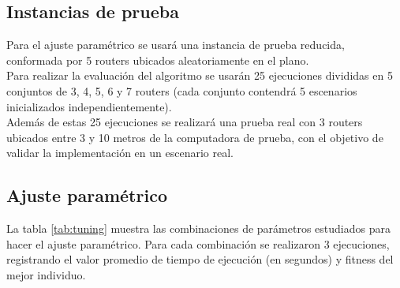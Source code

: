 \documentclass[journal]{IEEEtran}
\begin{document}
\subsection{Instancias de prueba}

Para el ajuste paramétrico se usará una instancia de prueba reducida, conformada por 5 routers ubicados aleatoriamente en el plano.\\

Para realizar la evaluación del algoritmo se usarán 25 ejecuciones divididas en 5 conjuntos de 3, 4, 5, 6 y 7 routers (cada conjunto contendrá 5 escenarios inicializados independientemente).\\

Además de estas 25 ejecuciones se realizará una prueba real con 3 routers ubicados entre 3 y 10 metros de la computadora de prueba, con el objetivo de validar la implementación en un escenario real.\\

\subsection{Ajuste paramétrico}

La tabla \ref{tab:tuning} muestra las combinaciones de parámetros estudiados para hacer el ajuste paramétrico. Para cada combinación se realizaron 3 ejecuciones, registrando el valor promedio de tiempo de ejecución (en segundos) y fitness del mejor individuo.
\end{document}
